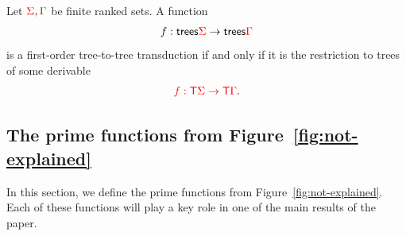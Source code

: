 
\begin{theorem}\label{thm:main}
    Let ${\color{red}{\Sigma}},{\color{red}{\Gamma}}$ be finite ranked sets. A function 
    \begin{align*}
        f : \mathsf {trees} {\color{red}{\Sigma}} \to \mathsf {trees} {\color{red}{\Gamma}}
    \end{align*}
    is a first-order tree-to-tree transduction if and only if it is the restriction to trees of some derivable
    \begin{align*}
        {\color{red}{f : {\color{red}{\mathsf T}}\Sigma \to {\color{red}{\mathsf T}}\Gamma}}.
    \end{align*}
    
\end{theorem}



%
\subsection{The prime functions from Figure~\ref{fig:not-explained}}
\label{sec:prime-and-combinators}
In this section, we define the prime functions from Figure~\ref{fig:not-explained}. 
Each of these functions will play a key role in one of the main results of the paper.


